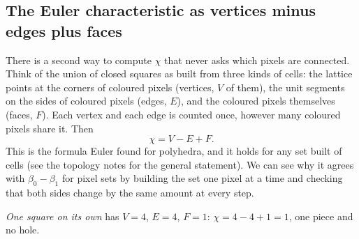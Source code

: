 \subsection{The Euler characteristic as vertices minus edges plus faces}
\label{12a:sec:vef}

There is a second way to compute $\chi$ that never asks which pixels are connected. Think of the union of
closed squares as built from three kinds of cells: the lattice points at the corners of coloured pixels
(vertices, $V$ of them), the unit segments on the sides of coloured pixels (edges, $E$), and the coloured
pixels themselves (faces, $F$). Each vertex and each edge is counted once, however many coloured pixels
share it. Then
\begin{equation}
  \chi=V-E+F .
  \label{12a:eq:vef}
\end{equation}
This is the formula Euler found for polyhedra, and it holds for any set built of cells (see the topology
notes for the general statement). We can see why it agrees with $\beta_0-\beta_1$ for pixel sets by
building the set one pixel at a time and checking that both sides change by the same amount at every step.

\emph{One square on its own} has $V=4$, $E=4$, $F=1$: $\chi=4-4+1=1$, one piece and no hole.

